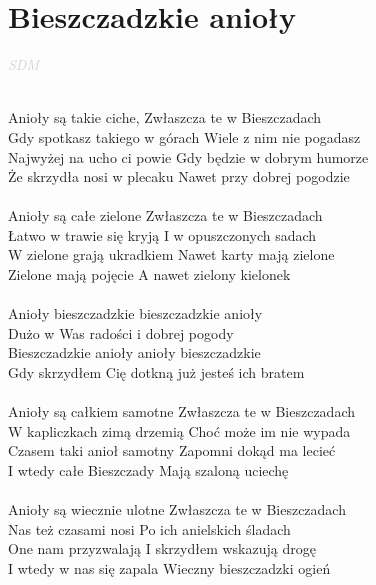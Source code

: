 \documentclass[a5paper, 10pt]{book}
\begin{document}
\newpage
\section{Bieszczadzkie anioły}\textcolor{lightgray}{\textit{SDM}}\\~\\
\begin{minipage}[t]{0.8\textwidth}
Anioły są takie ciche, Zwłaszcza te w Bieszczadach\\
Gdy spotkasz takiego w górach Wiele z nim nie pogadasz\\
Najwyżej na ucho ci powie Gdy będzie w dobrym humorze\\
Że skrzydła nosi w plecaku Nawet przy dobrej pogodzie\\
\\
Anioły są całe zielone Zwłaszcza te w Bieszczadach\\
Łatwo w trawie się kryją I w opuszczonych sadach\\
W zielone grają ukradkiem Nawet karty mają zielone\\
Zielone mają pojęcie A nawet zielony kielonek\\
\\
\hspace*{4mm}Anioły bieszczadzkie bieszczadzkie anioły\\
\hspace*{4mm}Dużo w Was radości i dobrej pogody\\
\hspace*{4mm}Bieszczadzkie anioły anioły bieszczadzkie\\
\hspace*{4mm}Gdy skrzydłem Cię dotkną już jesteś ich bratem\\
\\
Anioły są całkiem samotne Zwłaszcza te w Bieszczadach\\
W kapliczkach zimą drzemią Choć może im nie wypada\\
Czasem taki anioł samotny Zapomni dokąd ma lecieć\\
I wtedy całe Bieszczady Mają szaloną uciechę\\
\\
Anioły są wiecznie ulotne Zwłaszcza te w Bieszczadach\\
Nas też czasami nosi Po ich anielskich śladach\\
One nam przyzwalają I skrzydłem wskazują drogę\\
I wtedy w nas się zapala Wieczny bieszczadzki ogień\\
\end{minipage}
\end{document}
